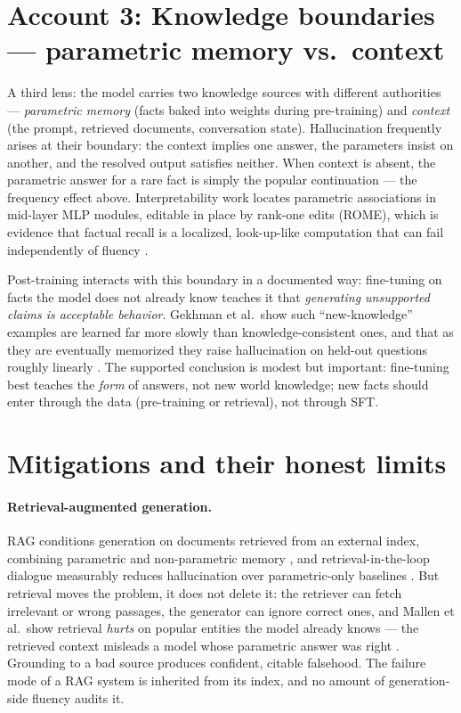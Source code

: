 \documentclass[11pt]{article}
\begin{document}
\section{Account 3: Knowledge boundaries --- parametric memory vs.\ context}
A third lens: the model carries two knowledge sources with different authorities --- \emph{parametric memory} (facts baked into weights during pre-training) and \emph{context} (the prompt, retrieved documents, conversation state). Hallucination frequently arises at their boundary: the context implies one answer, the parameters insist on another, and the resolved output satisfies neither. When context is absent, the parametric answer for a rare fact is simply the popular continuation --- the frequency effect above. Interpretability work locates parametric associations in mid-layer MLP modules, editable in place by rank-one edits (ROME), which is evidence that factual recall is a localized, look-up-like computation that can fail independently of fluency \cite{meng2022rome}.

Post-training interacts with this boundary in a documented way: fine-tuning on facts the model does not already know teaches it that \emph{generating unsupported claims is acceptable behavior}. Gekhman et al.\ show such ``new-knowledge'' examples are learned far more slowly than knowledge-consistent ones, and that as they are eventually memorized they raise hallucination on held-out questions roughly linearly \cite{gekhman2024finetuning}. The supported conclusion is modest but important: fine-tuning best teaches the \emph{form} of answers, not new world knowledge; new facts should enter through the data (pre-training or retrieval), not through SFT.

\section{Mitigations and their honest limits}
\paragraph{Retrieval-augmented generation.} RAG conditions generation on documents retrieved from an external index, combining parametric and non-parametric memory \cite{lewis2020rag}, and retrieval-in-the-loop dialogue measurably reduces hallucination over parametric-only baselines \cite{shuster2021retrieval}. But retrieval moves the problem, it does not delete it: the retriever can fetch irrelevant or wrong passages, the generator can ignore correct ones, and Mallen et al.\ show retrieval \emph{hurts} on popular entities the model already knows --- the retrieved context misleads a model whose parametric answer was right \cite{mallen2023trust}. Grounding to a bad source produces confident, citable falsehood. The failure mode of a RAG system is inherited from its index, and no amount of generation-side fluency audits it.
\end{document}
